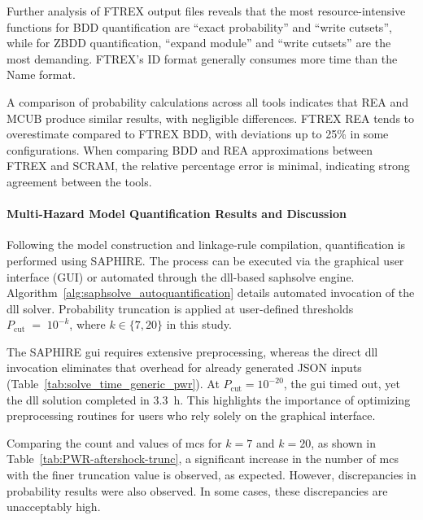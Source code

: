 Further analysis of FTREX output files reveals that the most resource-intensive functions for BDD quantification are ``exact probability'' and ``write cutsets'', while for ZBDD quantification, ``expand module'' and ``write cutsets'' are the most demanding. FTREX's ID format generally consumes more time than the Name format.

A comparison of probability calculations across all tools indicates that REA and MCUB produce similar results, with negligible differences. FTREX REA tends to overestimate compared to FTREX BDD, with deviations up to 25\% in some configurations. When comparing BDD and REA approximations between FTREX and SCRAM, the relative percentage error is minimal, indicating strong agreement between the tools.

\paragraph{Multi-Hazard Model Quantification Results and Discussion}

Following the model construction and linkage-rule compilation, quantification is performed using SAPHIRE. The process can be executed via the graphical user interface (GUI) or automated through the \acrshort{dll}-based \acrshort{saphsolve} engine. Algorithm~\ref{alg:saphsolve_autoquantification} details automated invocation of the \acrshort{dll} solver. Probability truncation is applied at user-defined thresholds $P_{\text{cut}} \;=\;10^{-k}$, where $k\in\{7,20\}$ in this study.



The SAPHIRE \acrshort{gui} requires extensive preprocessing, whereas the direct \acrshort{dll} invocation eliminates that overhead for already generated JSON inputs (Table~\ref{tab:solve_time_generic_pwr}). At $P_{\text{cut}}=10^{-20}$, the \acrshort{gui} timed out, yet the \acrshort{dll} solution completed in \SI{3.3}{h}.  This highlights the importance of optimizing preprocessing routines for users who rely solely on the graphical interface.



Comparing the count and values of \acrfull{mcs} for $k=7$ and $k=20$, as shown in Table~\ref{tab:PWR-aftershock-trunc}, a significant increase in the number of \acrshort{mcs} with the finer truncation value is observed, as expected. However, discrepancies in probability results were also observed. In some cases, these discrepancies are unacceptably high.

